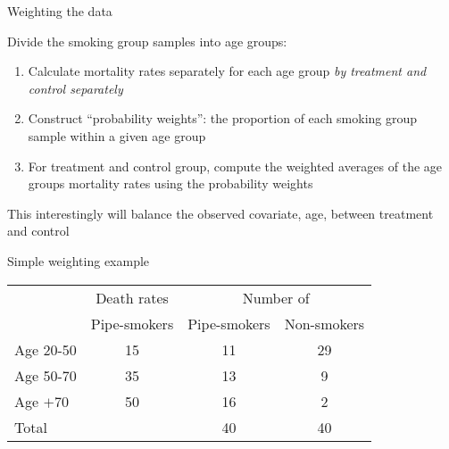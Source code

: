 \documentclass{beamer}
\begin{document}
\begin{frame}{Weighting the data}

  Divide the smoking group samples into age groups:
  \begin{enumerate}
		\item Calculate mortality rates separately for each age group \emph{by treatment and control separately}
		\item Construct ``probability weights'': the proportion of each smoking group sample within a given age group
		\item For treatment and control group, compute the weighted averages of the age groups mortality rates using the probability weights
  \end{enumerate}
This interestingly will balance the observed covariate, age, between treatment and control


\end{frame}


\begin{frame}{Simple weighting example}
	


	\begin{table}\centering
		\begin{center}
		\begin{tabular}{lccc}
		\hline \hline
		\multicolumn{1}{l}{}&
		\multicolumn{1}{c}{Death rates}&
		\multicolumn{2}{c}{Number of}\\
		\multicolumn{1}{l}{}&
		\multicolumn{1}{c}{Pipe-smokers}&
		\multicolumn{1}{c}{Pipe-smokers}&
		\multicolumn{1}{c}{Non-smokers}\\
		\hline
		Age 20-50 & 15 & 11 & 29 \\
		Age 50-70 & 35 & 13 & 9 \\
		Age $+$70 & 50 & 16 & 2 \\
		Total & & 40 & 40 \\		
		\hline
		\end{tabular}
		\end{center}
	\end{table}
	
	\begin{flalign*}
    \\
     \\
     \\ 
    \\
	\end{flalign*}

\end{frame}
\end{document}
